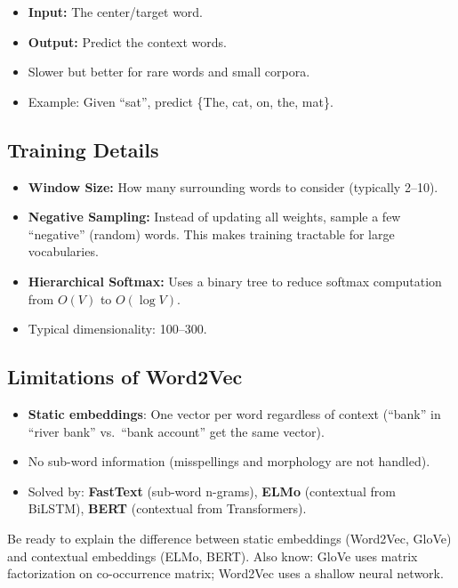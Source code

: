 \documentclass[11pt,a4paper]{article}
\begin{document}
\begin{keybox}
\begin{itemize}[nosep]
  \item \textbf{Input:} The center/target word.
  \item \textbf{Output:} Predict the context words.
  \item Slower but better for rare words and small corpora.
  \item Example: Given ``sat'', predict \{The, cat, on, the, mat\}.
\end{itemize}
\end{keybox}

\subsection{Training Details}
\begin{itemize}[nosep]
  \item \textbf{Window Size:} How many surrounding words to consider (typically 2--10).
  \item \textbf{Negative Sampling:} Instead of updating all weights, sample a few ``negative'' (random) words. This makes training tractable for large vocabularies.
  \item \textbf{Hierarchical Softmax:} Uses a binary tree to reduce softmax computation from $O(V)$ to $O(\log V)$.
  \item Typical dimensionality: 100--300.
\end{itemize}

\subsection{Limitations of Word2Vec}
\begin{itemize}[nosep]
  \item \textbf{Static embeddings}: One vector per word regardless of context (``bank'' in ``river bank'' vs.\ ``bank account'' get the same vector).
  \item No sub-word information (misspellings and morphology are not handled).
  \item Solved by: \textbf{FastText} (sub-word n-grams), \textbf{ELMo} (contextual from BiLSTM), \textbf{BERT} (contextual from Transformers).
\end{itemize}

\begin{tipbox}
Be ready to explain the difference between static embeddings (Word2Vec, GloVe) and contextual embeddings (ELMo, BERT). Also know: GloVe uses matrix factorization on co-occurrence matrix; Word2Vec uses a shallow neural network.
\end{tipbox}
\end{document}
